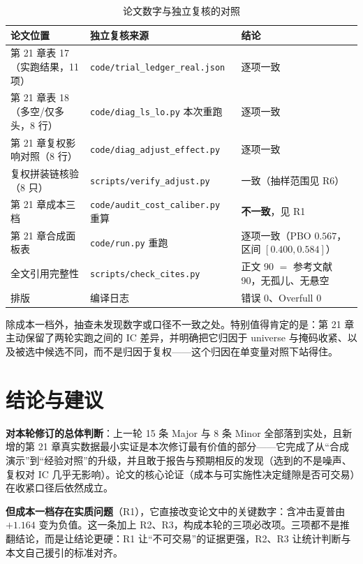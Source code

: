 \documentclass[11pt,a4paper]{ctexart}
\begin{document}
\begin{table}[htbp]
\centering
\caption{论文数字与独立复核的对照}
\label{tab:consistency}
\begin{tabular}{@{}>{\raggedright\arraybackslash}p{4.4cm}>{\raggedright\arraybackslash}p{4.6cm}>{\raggedright\arraybackslash}p{4.6cm}@{}}
\toprule
论文位置 & 独立复核来源 & 结论 \\
\midrule
第 21 章表 17（实跑结果，11 项） & \texttt{code/trial\_ledger\_real.json} & 逐项一致 \\
第 21 章表 18（多空/仅多头，8 行） & \texttt{code/diag\_ls\_lo.py} 本次重跑 & 逐项一致 \\
第 21 章复权影响对照（8 行） & \texttt{code/diag\_adjust\_effect.py} & 逐项一致 \\
复权拼装链核验（8 只） & \texttt{scripts/verify\_adjust.py} & 一致（抽样范围见 R6） \\
第 21 章成本三档 & \texttt{code/audit\_cost\_caliber.py} 重算 & \textbf{不一致}，见 R1 \\
第 21 章合成面板表 & \texttt{code/run.py} 重跑 & 逐项一致（PBO $0.567$，区间 $[0.400,0.584]$） \\
全文引用完整性 & \texttt{scripts/check\_cites.py} & 正文 90 $=$ 参考文献 90，无孤儿、无悬空 \\
排版 & 编译日志 & 错误 0、Overfull 0 \\
\bottomrule
\end{tabular}
\end{table}

除成本一档外，抽查未发现数字或口径不一致之处。特别值得肯定的是：第 21 章主动保留了两轮实跑之间的 IC 差异，并明确把它归因于 universe 与掩码收紧、以及被选中候选不同，而不是归因于复权——这个归因在单变量对照下站得住。

\section{结论与建议}

\textbf{对本轮修订的总体判断}：上一轮 15 条 Major 与 8 条 Minor 全部落到实处，且新增的第 21 章真实数据最小实证是本次修订最有价值的部分——它完成了从“合成演示”到“经验对照”的升级，并且敢于报告与预期相反的发现（选到的不是噪声、复权对 IC 几乎无影响）。论文的核心论证（成本与可实施性决定缝隙是否可交易）在收紧口径后依然成立。

\textbf{但成本一档存在实质问题}（R1），它直接改变论文中的关键数字：含冲击夏普由 $+1.164$ 变为负值。这一条加上 R2、R3，构成本轮的三项必改项。三项都不是推翻结论，而是让结论更硬：R1 让“不可交易”的证据更强，R2、R3 让统计判断与本文自己援引的标准对齐。
\end{document}
